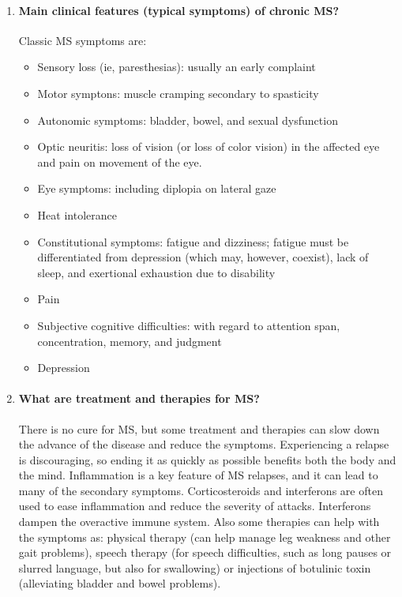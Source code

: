 \documentclass[12pt,article,oneside,a4paper]{memoir}
\begin{document}
\begin{enumerate}
\item \paragraph{Main clinical features (typical symptoms) of chronic MS?}\label{question:MS-symptoms}

Classic MS symptoms are:
\begin{itemize}
\item Sensory loss (ie, paresthesias): usually an early complaint
\item Motor symptons: muscle cramping secondary to spasticity
\item Autonomic symptoms: bladder, bowel, and sexual dysfunction
\item Optic neuritis: loss of vision (or loss of color vision) in the affected eye and pain on movement of the eye. 
\item Eye symptoms: including diplopia on lateral gaze
\item Heat intolerance
\item Constitutional symptoms: fatigue and dizziness; fatigue must be differentiated from depression (which may, however, coexist), lack of sleep, and exertional exhaustion due to disability
\item Pain
\item Subjective cognitive difficulties: with regard to attention span, concentration, memory, and judgment
\item Depression
\end{itemize}

\item \paragraph{What are treatment and therapies for MS?}
There is no cure for MS, but some treatment and therapies can slow down the advance of the disease and reduce the symptoms.
Experiencing a relapse is discouraging, so ending it as quickly as possible benefits both the body and the mind. Inflammation is a key feature of MS relapses, and it can lead to many of the secondary symptoms. Corticosteroids and interferons are often used to ease inflammation and reduce the severity of attacks. Interferons dampen the overactive immune system. Also some therapies can help with the symptoms as: physical therapy (can help manage leg weakness and other gait problems), speech therapy (for speech difficulties, such as long pauses or slurred language, but also for swallowing) or injections of botulinic toxin (alleviating bladder and bowel problems).


\end{enumerate}
\end{document}
